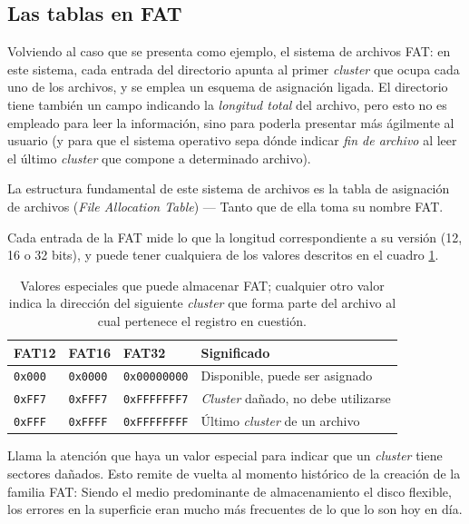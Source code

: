 \documentclass[11pt,fleqn]{book} %
\begin{document}
\subsection{Las tablas en FAT}
\label{sec-7-2-4}
\label{FS_tablas_fat}


Volviendo al caso que se presenta como ejemplo, el sistema de
archivos FAT: en este sistema, cada entrada del directorio apunta al
primer \emph{cluster} que ocupa cada uno de los archivos, y se emplea un
esquema de asignación ligada. El directorio tiene también un campo
indicando la \emph{longitud total} del archivo, pero esto no es empleado
para leer la información, sino para poderla presentar más ágilmente al
usuario (y para que el sistema operativo sepa dónde indicar \emph{fin de archivo} al leer el último \emph{cluster} que compone a determinado archivo).

La estructura fundamental de este sistema de archivos es la tabla de
asignación de archivos (\emph{File Allocation Table}) — Tanto que de ella
toma su nombre FAT.

Cada entrada de la FAT mide lo que la longitud correspondiente a su
versión (12, 16 o 32 bits), y puede tener cualquiera de los valores
descritos en el cuadro \ref{FS_valores_especiales_fat}.

\begin{table}[htb]
\caption{Valores especiales que puede almacenar FAT; cualquier otro valor indica la dirección del siguiente \emph{cluster} que forma parte del archivo al cual pertenece el registro en cuestión.} \label{FS_valores_especiales_fat}
\begin{center}
\begin{tabular}{llll}
 FAT12           &  FAT16            &  FAT32                &  Significado                                \\
\hline
 \texttt{0x000}  &  \texttt{0x0000}  &  \texttt{0x00000000}  &  Disponible, puede ser asignado             \\
 \texttt{0xFF7}  &  \texttt{0xFFF7}  &  \texttt{0xFFFFFFF7}  &  \emph{Cluster} dañado, no debe utilizarse  \\
 \texttt{0xFFF}  &  \texttt{0xFFFF}  &  \texttt{0xFFFFFFFF}  &  Último \emph{cluster} de un archivo        \\
\end{tabular}
\end{center}
\end{table}


Llama la atención que haya un valor especial para indicar que un
\emph{cluster} tiene sectores dañados. Esto remite de vuelta al momento
histórico de la creación de la familia FAT: Siendo el medio
predominante de almacenamiento el disco flexible, los errores en la
superficie eran mucho más frecuentes de lo que lo son hoy en día.
\end{document}

